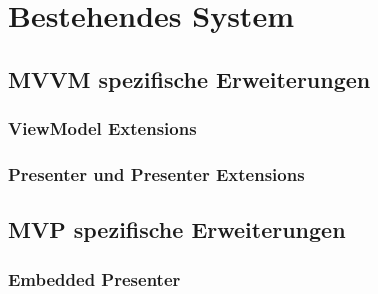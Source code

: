 \chapter{Bestehendes System}
\label{cha:basis}

\section{MVVM spezifische Erweiterungen}
\label{sec:mvvm_extensions}

\subsection{ViewModel Extensions}
\label{subsec:viewmodel_extensions}

\subsection{Presenter und Presenter Extensions}
\label{subsec:presenter_extensions}

\section{MVP spezifische Erweiterungen}
\label{sec:mvp_extensions}

\subsection{Embedded Presenter}
\label{subsec:embedded_presenter}